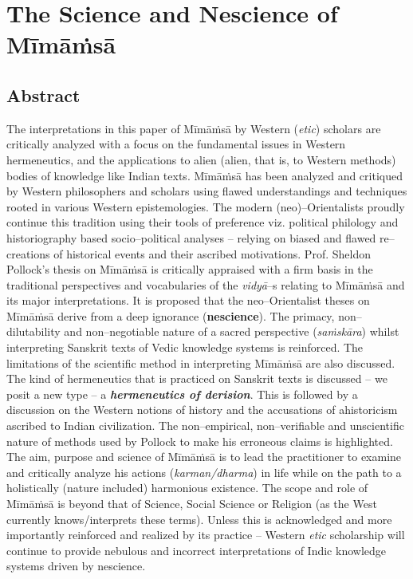 
\chapter{The Science and Nescience of Mīmāṁsā}



\section*{Abstract}

The interpretations in this paper of Mīmāṁsā by Western (\textit{etic}) scholars are critically analyzed with a focus on the fundamental issues in Western hermeneutics, and the applications to alien (alien, that is, to Western methods) bodies of knowledge like Indian texts. Mīmāṁsā has been analyzed and critiqued by Western philosophers and scholars using flawed understandings and techniques rooted in various Western epistemologies. The modern (neo)–Orientalists proudly continue this tradition using their tools of preference viz. political philology and historiography based socio–political analyses – relying on biased and flawed re–creations of historical events and their ascribed motivations. Prof. Sheldon Pollock's thesis on Mīmāṁsā is critically appraised with a firm basis in the traditional perspectives and vocabularies of the \textit{vidyā}–s relating to Mīmāṁsā and its major interpretations. It is proposed that the neo–Orientalist theses on Mīmāṁsā derive from a deep ignorance (\textbf{nescience}). The primacy, non–dilutability and non–negotiable nature of a sacred perspective (\textit{saṁskāra}) whilst interpreting Sanskrit texts of Vedic knowledge systems is reinforced. The limitations of the scientific method in interpreting Mīmāṁsā are also discussed. The kind of hermeneutics that is practiced on Sanskrit texts is discussed – we posit a new type – a \textbf{\textit{hermeneutics of derision}}. This is followed by a discussion on the Western notions of history and the accusations of ahistoricism ascribed to Indian civilization. The non–empirical, non–verifiable and unscientific nature of methods used by Pollock to make his erroneous claims is highlighted. The aim, purpose and science of Mīmāṁsā is to lead the practitioner to examine and critically analyze his actions (\textit{karman/dharma}) in life while on the path to a holistically (nature included) harmonious existence. The scope and role of Mīmāṁsā is beyond that of Science, Social Science or Religion (as the West currently knows/interprets these terms). Unless this is acknowledged and more importantly reinforced and realized by its practice – Western \textit{etic} scholarship will continue to provide nebulous and incorrect interpretations of Indic knowledge systems driven by nescience.


